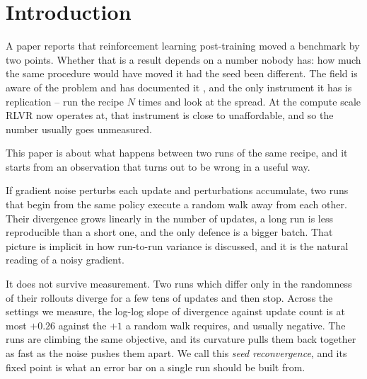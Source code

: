 \section{Introduction}
\label{sec:introduction}

A paper reports that reinforcement learning post-training moved a benchmark by two points. Whether
that is a result depends on a number nobody has: how much the same procedure would have moved it
had the seed been different. The field is aware of the problem and has documented it
\citep{hochlehnert2025sober}, and the only instrument it has is replication -- run the recipe $N$
times and look at the spread. At the compute scale RLVR now operates at, that instrument is close to
unaffordable, and so the number usually goes unmeasured.

This paper is about what happens between two runs of the same recipe, and it starts from an
observation that turns out to be wrong in a useful way.

If gradient noise perturbs each update and perturbations accumulate, two runs that begin from the
same policy execute a random walk away from each other. Their divergence grows linearly in the
number of updates, a long run is less reproducible than a short one, and the only defence is a
bigger batch. That picture is implicit in how run-to-run variance is discussed, and it is the
natural reading of a noisy gradient.

It does not survive measurement. Two runs which differ only in the randomness of their rollouts
diverge for a few tens of updates and then stop. Across the settings we measure, the log-log slope
of divergence against update count is at most $+0.26$ against the $+1$ a random walk requires, and
usually negative. The runs are climbing the same objective, and its curvature pulls them back
together as fast as the noise pushes them apart. We call this \emph{seed reconvergence}, and its
fixed point is what an error bar on a single run should be built from.

